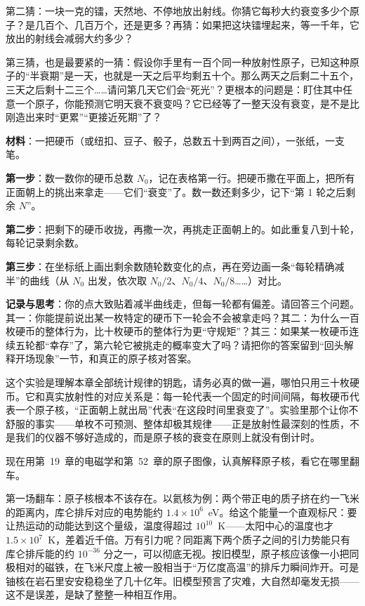 第二猜：一块一克的镭，天然地、不停地放出射线。你猜它每秒大约衰变多少个原子？是几百个、几百万个，还是更多？再猜：如果把这块镭埋起来，等一千年，它放出的射线会减弱大约多少？

第三猜，也是最要紧的一猜：假设你手里有一百个同一种放射性原子，已知这种原子的“半衰期”是一天，也就是一天之后平均剩五十个。那么两天之后剩二十五个，三天之后剩十二三个……请问第几天它们会“死光”？更根本的问题是：盯住其中任意一个原子，你能预测它明天衰不衰变吗？它已经等了一整天没有衰变，是不是比刚造出来时“更累”“更接近死期”了？


\begin{experiment}[用一百枚硬币模拟衰变]
\textbf{材料}：一把硬币（或纽扣、豆子、骰子，总数五十到两百之间），一张纸，一支笔。

\textbf{第一步}：数一数你的硬币总数 \(N_0\)，记在表格第一行。把硬币撒在平面上，把所有正面朝上的挑出来拿走——它们“衰变”了。数一数还剩多少，记下“第 1 轮之后剩余 \(N\)”。

\textbf{第二步}：把剩下的硬币收拢，再撒一次，再挑走正面朝上的。如此重复八到十轮，每轮记录剩余数。

\textbf{第三步}：在坐标纸上画出剩余数随轮数变化的点，再在旁边画一条“每轮精确减半”的曲线（从 \(N_0\) 出发，依次取 \(N_0/2\)、\(N_0/4\)、\(N_0/8\)……）对比。

\textbf{记录与思考}：你的点大致贴着减半曲线走，但每一轮都有偏差。请回答三个问题。其一：你能提前说出某一枚特定的硬币下一轮会不会被拿走吗？其二：为什么一百枚硬币的整体行为，比十枚硬币的整体行为更“守规矩”？其三：如果某一枚硬币连续五轮都“幸存”了，第六轮它被挑走的概率变大了吗？请把你的答案留到“回头解释开场现象”一节，和真正的原子核对答案。
\end{experiment}

这个实验是理解本章全部统计规律的钥匙，请务必真的做一遍，哪怕只用三十枚硬币。它和真实放射性的对应关系是：每一轮代表一个固定的时间间隔，每枚硬币代表一个原子核，“正面朝上就出局”代表“在这段时间里衰变了”。实验里那个让你不舒服的事实——单枚不可预测、整体却极其规律——正是放射性最深刻的性质，不是我们的仪器不够好造成的，而是原子核的衰变在原则上就没有倒计时。


现在用第~19~章的电磁学和第~52~章的原子图像，认真解释原子核，看它在哪里翻车。

第一场翻车：原子核根本不该存在。以氦核为例：两个带正电的质子挤在约一飞米的距离内，库仑排斥对应的电势能约 \(1.4\times10^{6}\)~eV。给这个能量一个直观标尺：要让热运动的动能达到这个量级，温度得超过 \(10^{10}\)~K——太阳中心的温度也才 \(1.5\times10^{7}\)~K，差着近千倍。万有引力呢？同距离下两个质子之间的引力势能只有库仑排斥能的约 \(10^{-36}\) 分之一，可以彻底无视。按旧模型，原子核应该像一小把同极相对的磁铁，在飞米尺度上被一股相当于“万亿度高温”的排斥力瞬间炸开。可是铀核在岩石里安安稳稳坐了几十亿年。旧模型预言了灾难，大自然却毫发无损——这不是误差，是缺了整整一种相互作用。

